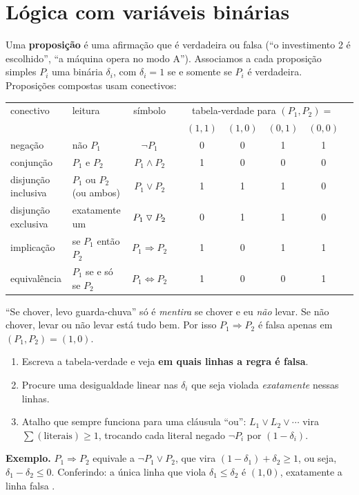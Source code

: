 \section{Lógica com variáveis binárias}
\label{sec:logica}

Uma \textbf{proposição} é uma afirmação que é verdadeira ou falsa (``o investimento 2 é escolhido'', ``a máquina
opera no modo A''). Associamos a cada proposição simples $P_i$ uma binária $\delta_i$, com $\delta_i=1$ se e somente
se $P_i$ é verdadeira. Proposições compostas usam conectivos:

\begin{center}
\begin{tabular}{llcc|ccccc}
\toprule
conectivo & leitura & símbolo & & \multicolumn{4}{c}{tabela-verdade para $(P_1,P_2)=$}\\
& & & & $(1,1)$ & $(1,0)$ & $(0,1)$ & $(0,0)$\\
\midrule
negação & não $P_1$ & $\neg P_1$ & & 0 & 0 & 1 & 1\\
conjunção & $P_1$ e $P_2$ & $P_1\wedge P_2$ & & 1 & 0 & 0 & 0\\
disjunção inclusiva & $P_1$ ou $P_2$ (ou ambos) & $P_1\vee P_2$ & & 1 & 1 & 1 & 0\\
disjunção exclusiva & exatamente um & $P_1\mathbin{\triangledown} P_2$ & & 0 & 1 & 1 & 0\\
implicação & se $P_1$ então $P_2$ & $P_1\Rightarrow P_2$ & & 1 & 0 & 1 & 1\\
equivalência & $P_1$ se e só se $P_2$ & $P_1\Leftrightarrow P_2$ & & 1 & 0 & 0 & 1\\
\bottomrule
\end{tabular}
\end{center}

\begin{atencao}
``Se chover, levo guarda-chuva'' só é \emph{mentira} se chover e eu \emph{não} levar. Se não chover, levar ou não
levar está tudo bem. Por isso $P_1\Rightarrow P_2$ é falsa apenas em $(P_1,P_2)=(1,0)$.
\end{atencao}

\begin{receita}
\begin{enumerate}
  \item Escreva a tabela-verdade e veja \textbf{em quais linhas a regra é falsa}.
  \item Procure uma desigualdade linear nas $\delta_i$ que seja violada \emph{exatamente} nessas linhas.
  \item Atalho que sempre funciona para uma cláusula ``ou'': $L_1\vee L_2\vee\cdots$ vira
  $\sum(\text{literais})\ge1$, trocando cada literal negado $\neg P_i$ por $(1-\delta_i)$.
\end{enumerate}
\textbf{Exemplo.} $P_1\Rightarrow P_2$ equivale a $\neg P_1\vee P_2$, que vira $(1-\delta_1)+\delta_2\ge1$, ou seja,
$\delta_1-\delta_2\le 0$. Conferindo: a única linha que viola $\delta_1\le\delta_2$ é $(1,0)$, exatamente a linha
falsa \checkmark.
\end{receita}

